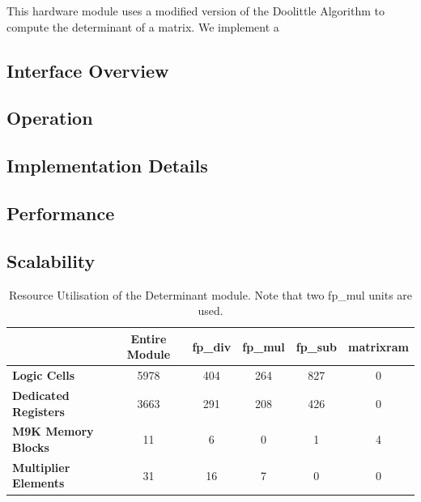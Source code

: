 \documentclass[]{article}
\begin{document}
This hardware module uses a modified version of the Doolittle Algorithm to compute the determinant of a matrix.
We implement a 


\subsection{Interface Overview} %
\label{sub:interface_overview}




\subsection{Operation} %
\label{sub:det_operation}




\subsection{Implementation Details} %
\label{sub:implementation_details}




\subsection{Performance} %
\label{sub:performance}




\subsection{Scalability} %
\label{sub:scalability}






\begin{table}[htbp]
	\caption{Resource Utilisation of the Determinant module. Note that two fp\_mul units are used.}
	\label{tab:resource_util_det}
	\begin{center}
		\begin{tabular}{l|ccccc}
		\hline

		\hline
											& \textbf{Entire Module} 	& \textbf{fp\_div} 		& \textbf{fp\_mul}	& \textbf{fp\_sub} 	& \textbf{matrixram} \\
		\hline
			\textbf{Logic Cells} 			& 5978						& 404 					& 264 				& 827 				& 0 \\
		\hline
			\textbf{Dedicated Registers}	& 3663						& 291 					& 208 				& 426				& 0 \\
		\hline
			\textbf{M9K Memory Blocks}		& 11						& 6 					& 0 				& 1 				& 4 \\
		\hline
			\textbf{Multiplier Elements}	& 31						& 16 					& 7 				& 0					& 0 \\
		\hline

		\hline
		\end{tabular}
	\end{center}
\end{table}
\end{document}
